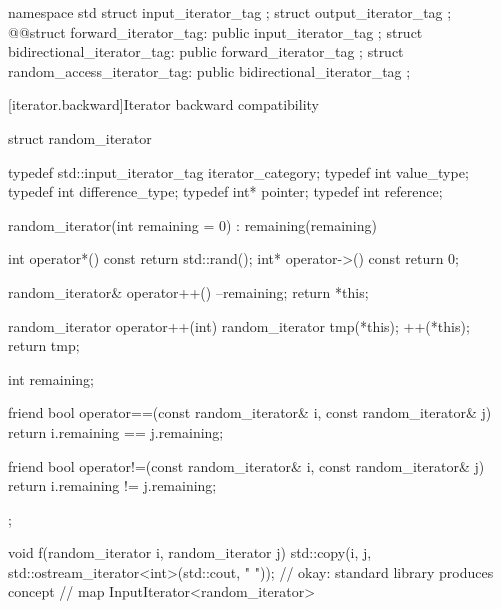 \documentclass[american,twoside]{book}
\begin{document}
\begin{codeblock}
namespace std {
  struct input_iterator_tag {};
  struct output_iterator_tag {};
  @\color{black}@struct forward_iterator_tag: public input_iterator_tag {};
  struct bidirectional_iterator_tag: public forward_iterator_tag {};
  struct random_access_iterator_tag: public bidirectional_iterator_tag {};
}
\end{codeblock}

\pnum 
{}

\color{addclr}
[iterator.backward]{Iterator backward compatibility}

\pnum
{}
\begin{codeblock}
struct random_iterator
{
  typedef std::input_iterator_tag iterator_category;
  typedef int                     value_type;
  typedef int                     difference_type;
  typedef int*                    pointer;
  typedef int                     reference;

  random_iterator(int remaining = 0) : remaining(remaining) { }

  int operator*() const { return std::rand(); }
  int* operator->() const { return 0; }
  
  random_iterator& operator++() { --remaining; return *this; }

  random_iterator operator++(int) { 
    random_iterator tmp(*this); ++(*this); return tmp;
  }

  int remaining;

  friend bool 
  operator==(const random_iterator& i, const random_iterator& j)
  {
    return i.remaining == j.remaining;
  }

  friend bool 
  operator!=(const random_iterator& i, const random_iterator& j)
  {
    return i.remaining != j.remaining;
  }
};

void f(random_iterator i, random_iterator j) {
  std::copy(i, j, std::ostream_iterator<int>(std::cout, " ")); // okay: standard library produces concept
                                                               // map InputIterator<random_iterator>
}
\end{codeblock}
\addedConcepts{\exitexample}

\pnum
{}
\end{document}
